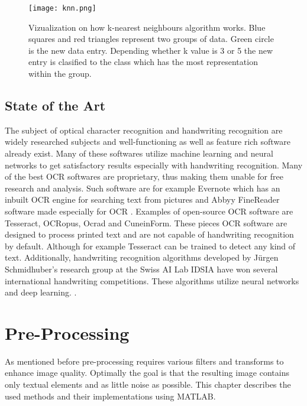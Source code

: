 \documentclass{article}
\begin{document}
          \begin{figure}
            \centering
            \texttt{[image: knn.png]}
            \caption{Vizualization on how k-nearest neighbours algorithm works. Blue squares
                      and red triangles represent two groups of data. Green circle is the new
                      data entry. Depending whether k value is 3 or 5 the new entry is clasified
                      to the class which has the most representation within the group.\label{fig:knn} }
          \end{figure}

    \subsection{State of the Art}
      The subject of optical character recognition and handwriting recognition are widely researched subjects and well-functioning as well as feature rich software already exist. Many of these softwares utilize machine learning and neural networks to get satisfactory results especially with handwriting recognition. Many of the best OCR softwares are proprietary, thus making them unable for free research and analysis. Such software are for example Evernote which has an inbuilt OCR engine for searching text from pictures \cite{Kelly} and Abbyy FineReader software made especially for OCR \cite{ABBYY}. Examples of open-source OCR software are Tesseract\cite{Smith2007a}, OCRopus\cite{Breuel2007}, Ocrad\cite{FreeSoftwareFoundation2016} and CuneinForm\cite{CognitiveTechnologies2016}. These pieces OCR software are designed to process printed text and are not capable of handwriting recognition by default. Although for example Tesseract can be trained to detect any kind of text.\cite{Smith2007a} Additionally, handwriting recognition algorithms developed by Jürgen Schmidhuber's research group at the Swiss AI Lab IDSIA have won several international handwriting competitions. These algorithms utilize neural networks and deep learning. \cite{Angelica}.


  \newpage
  \section{Pre-Processing}
  As mentioned before pre-processing requires various filters and transforms to enhance image quality. Optimally the goal is that the resulting image contains only textual elements and as little noise as possible. This chapter describes the used methods and their implementations using MATLAB.
\end{document}
